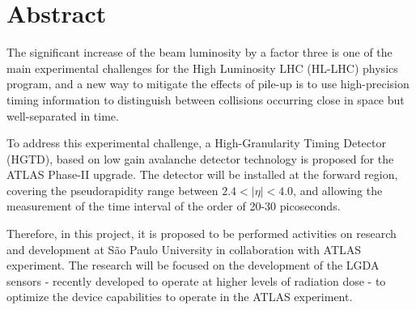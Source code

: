 \chapter*{Abstract}


The significant increase of the beam luminosity by a factor three \cite{tdr} is one of the main experimental challenges for the High Luminosity LHC (HL-LHC) physics program, and a new way to mitigate the effects of pile-up is to use high-precision timing information to distinguish between collisions occurring close in space but well-separated in time.

To address this experimental challenge, a High-Granularity Timing Detector (HGTD), based on low gain avalanche detector technology is proposed for the ATLAS Phase-II upgrade. The detector will be installed at the forward region, covering the pseudorapidity range between $2.4< |\eta| <4.0$, and allowing the measurement of the time interval of the order of 20-30 picoseconds.


Therefore, in this project, it is proposed to be performed activities on research and development at São Paulo University in collaboration with ATLAS experiment. The research will be focused on the development of the LGDA sensors - recently developed to operate at higher levels of radiation dose - to optimize the device capabilities to operate in the ATLAS experiment. %